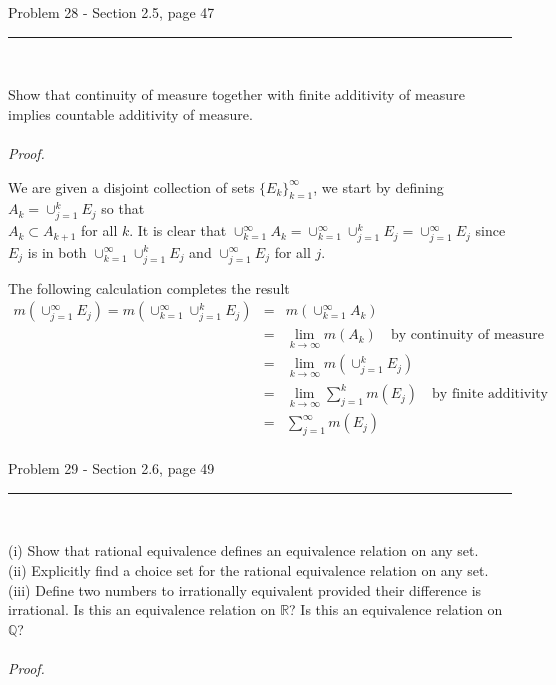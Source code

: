 \documentclass[11pt,reqno]{article}
\begin{document}
\begin{flushleft} 
Problem 28 - Section 2.5, page 47\\
\rule{500pt}{1pt}\\
\end{flushleft} 

Show that continuity of measure together with finite additivity of measure implies countable additivity of measure.
\\\\ \emph{Proof.}
	
We are given a disjoint collection of sets $\{ E_k \}_{k=1}^\infty$, we start by defining $A_k = \cup_{j = 1}^k E_j$ so that \\$A_k \subset A_{k + 1}$ for all $k$. 
It is clear that $\cup_{k = 1}^\infty A_k = \cup_{k = 1}^\infty \cup_{j = 1}^k E_j = \cup_{j = 1}^\infty E_j$ since $E_j$ is in both $\cup_{k = 1}^\infty \cup_{j = 1}^k E_j$ and  $\cup_{j = 1}^\infty E_j$ for all $j$.

The following calculation completes the result
\begin{eqnarray*}
m(\cup_{j = 1}^\infty E_j) = m(\cup_{k =1}^\infty \cup_{j = 1}^k E_j) &=& m(\cup_{k = 1}^\infty A_k) \\
&=& \lim_{k \to \infty } m(A_k) \quad \text{by continuity of measure} \\
&=& \lim_{k \to \infty } m(\cup_{j = 1}^k E_j) \\
&=& \lim_{k \to \infty } \sum_{j = 1}^k m(E_j) \quad \text{by finite additivity} \\
&=& \sum_{j = 1}^\infty m(E_j) \\
\end{eqnarray*}

\begin{flushleft} 
Problem 29 - Section 2.6, page 49\\
\rule{500pt}{1pt}\\
\end{flushleft} 

\noindent (i) Show that rational equivalence defines an equivalence relation on any set.\\
(ii) Explicitly find a choice set for the rational equivalence relation on any set.\\
(iii) Define two numbers to irrationally equivalent provided their difference is irrational. Is this an equivalence relation on $\mathbb{R}$? Is this an equivalence relation on $\mathbb{Q}$?
\\\\ \emph{Proof.}
\end{document}

